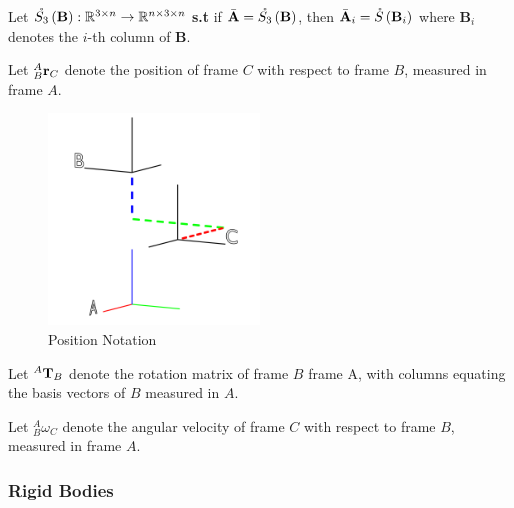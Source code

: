 \begin{definition}
Let $\Sn{\mathbf{B}} : \mathbb{R}^{3 \times n} \rightarrow \mathbb{R}^{n \times 3 \times n}$  \textbf{s.t}  if $\bar{\mathbf{A}} = \Sn{\mathbf{B}}$, then $\bar{\mathbf{A}}_i = \S{\mathbf{B}_{i}}$ where $\mathbf{B}_{i}$ denotes the $i$-th column of $\mathbf{B}$.
\end{definition}

\begin{definition}Let $^A_B\r_C$ denote the position of frame $C$ with respect to frame $B$, measured in frame $A$.
\begin{figure}[H]
    \centering
    \includegraphics[width=0.5\textwidth]{Figures/Intro/FramesNC.png}
    \caption{Position Notation}
    \label{fig:position_notation}
\end{figure}
\end{definition}

\begin{definition}Let $^A\T_B$ denote the rotation matrix of frame $B$ frame A, with columns equating the basis vectors of $B$ measured in $A$.
\end{definition}

\begin{definition}Let $^A_B\omega_C$ denote the angular velocity of frame $C$ with respect to frame $B$, measured in frame $A$.
\end{definition}

\subsubsection{Rigid Bodies}

